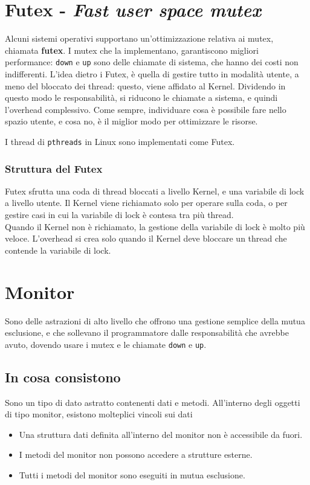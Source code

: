 \documentclass{report}
\begin{document}
\section{Futex - \textit{Fast user space mutex}}
Alcuni sistemi operativi supportano un'ottimizzazione relativa ai mutex, chiamata \textbf{futex}. I mutex che la implementano, garantiscono migliori performance: \verb*|down| e \verb*|up| sono delle chiamate di sistema, che hanno dei costi non indifferenti. L'idea dietro i Futex, è quella di gestire tutto in modalità utente, a meno del bloccato dei thread: questo, viene affidato al Kernel. Dividendo in questo modo le responsabilità, si riducono le chiamate a sistema, e quindi l'overhead complessivo. Come sempre, individuare cosa è possibile fare nello spazio utente, e cosa no, è il miglior modo per ottimizzare le risorse.

I thread di \verb*|pthreads| in Linux sono implementati come Futex.

\subsubsection{Struttura del Futex}
Futex sfrutta una coda di thread bloccati a livello Kernel, e una variabile di lock a livello utente. Il Kernel viene richiamato solo per operare sulla coda, o per gestire casi in cui la variabile di lock è contesa tra più thread.\\
Quando il Kernel non è richiamato, la gestione della variabile di lock è molto più veloce. L'overhead si crea solo quando il Kernel deve bloccare un thread che contende la variabile di lock.

\newpage

\section{Monitor}
Sono delle astrazioni di alto livello che offrono una gestione semplice della mutua esclusione, e che sollevano il programmatore dalle responsabilità che avrebbe avuto, dovendo usare i mutex e le chiamate \verb|down| e \verb|up|.

\subsection{In cosa consistono}
Sono un tipo di dato astratto contenenti dati e metodi. All'interno degli oggetti di tipo monitor, esistono molteplici vincoli sui dati
\begin{itemize}
    \item Una struttura dati definita all'interno del monitor non è accessibile da fuori.

    \item I metodi del monitor non possono accedere a strutture esterne.

    \item Tutti i metodi del monitor sono eseguiti in mutua esclusione.
\end{itemize}
\end{document}

